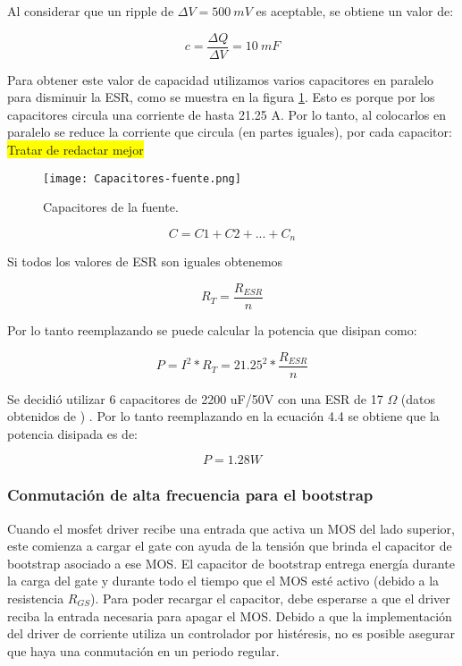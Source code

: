 \noindent Al considerar que un ripple de $\Delta V=500 \:mV$ es aceptable, se obtiene un valor de:

\begin{equation} 
	c = \frac{\Delta Q}{\Delta V} = 10 \:mF
\end{equation}

\noindent Para obtener este valor de capacidad utilizamos varios capacitores en paralelo para disminuir la ESR, como se muestra en la figura \ref{fig:img_capacitores-fuente}. Esto es porque por los capacitores circula una corriente de hasta 21.25 A. Por lo tanto, al colocarlos en paralelo se reduce la corriente que circula (en partes iguales), por cada capacitor:
\colorbox{yellow}{Tratar de redactar mejor}

\begin{figure}[H]
	\centering
	\texttt{[image: Capacitores-fuente.png]}
	\caption{Capacitores de la fuente.}
	\label{fig:img_capacitores-fuente}
\end{figure}


\begin{equation} 
	C = C1 + C2 + ... + C_n
\end{equation}


\noindent Si todos los valores de ESR son iguales obtenemos

\begin{equation} 
R_T = \frac{R_{ESR}}{n}
\end{equation}

\noindent Por lo tanto reemplazando se puede calcular la potencia que disipan como:

\begin{equation} 
	P = I^2 * R_T = 21.25^2 * \frac{R_{ESR}}{n}
\end{equation}

\noindent Se decidió utilizar 6 capacitores  de 2200 uF/50V con una ESR de 17 $\Omega$ (datos obtenidos de \cite{EKY-350ELL222MM25S}) . Por lo tanto reemplazando en la ecuación 4.4 se obtiene que la potencia disipada es de: 

\begin{equation} 
	P=1.28 W
\end{equation}


\subsubsection{Conmutación de alta frecuencia para el bootstrap}

\noindent Cuando el mosfet driver recibe una entrada que activa un MOS del lado superior, este comienza a cargar el gate con ayuda de la tensión que brinda el capacitor de bootstrap asociado a ese MOS. El capacitor de bootstrap entrega energía durante la carga del gate y durante todo el tiempo que el MOS esté activo (debido a la resistencia $R_{GS}$). Para poder recargar el capacitor, debe esperarse a que el driver reciba la entrada necesaria para apagar el MOS. Debido a que la implementación del driver de corriente utiliza un controlador por histéresis, no es posible asegurar que haya una conmutación en un periodo regular.

